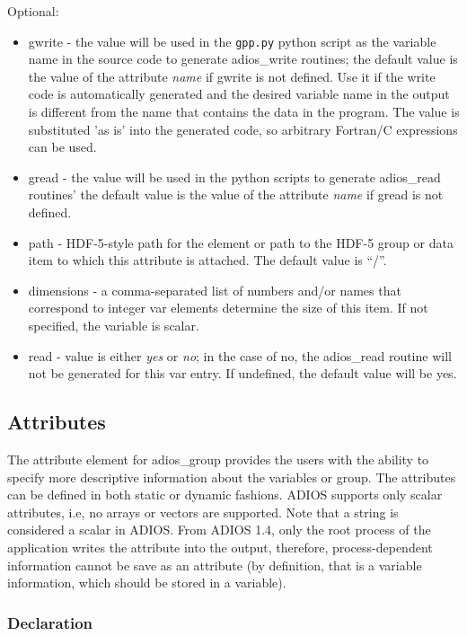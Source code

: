 Optional: 
\begin{itemize}
\item gwrite - the value will be used in the \verb+gpp.py+ python script as the 
variable name in the source code to generate adios\_write 
routines; the default value is the value of the attribute \textit{name} if gwrite 
is not defined. Use it if the write code is automatically generated and the desired
variable name in the output is different from the name that contains the data in the
program. The value is substituted 'as is' into the generated code, so arbitrary
Fortran/C expressions can be used. 
\item gread - the value will be used in the python scripts to generate adios\_read routines' 
the default value is the value of the attribute \textit{name} if  gread is not 
defined.
\item path - HDF-5-style path for the element or path to the HDF-5 group or data item 
to which this attribute is attached.  The default value is ``/''.
\item dimensions - a comma-separated list of numbers and/or names that correspond to 
integer var elements determine the size of this item. If not specified, the variable 
is scalar.
\item read - value is either \textit{yes} or \textit{no}; in the case of no, the adios\_read 
routine will not be generated for this var entry. If undefined, the default value 
will be yes. 
\end{itemize}

\subsection{Attributes}
The attribute element for adios\_group provides the users with the ability to specify 
more descriptive information about the variables or group. The attributes can be 
defined in both static or dynamic fashions. ADIOS supports only scalar attributes, i.e, 
no arrays or vectors are supported. Note that a string is considered a scalar in ADIOS. 
From ADIOS 1.4, only the root process of the application writes the attribute into 
the output, therefore, process-dependent information cannot be save as an attribute 
(by definition, that is a variable information, which should be stored in a variable).

\subsubsection{Declaration}

